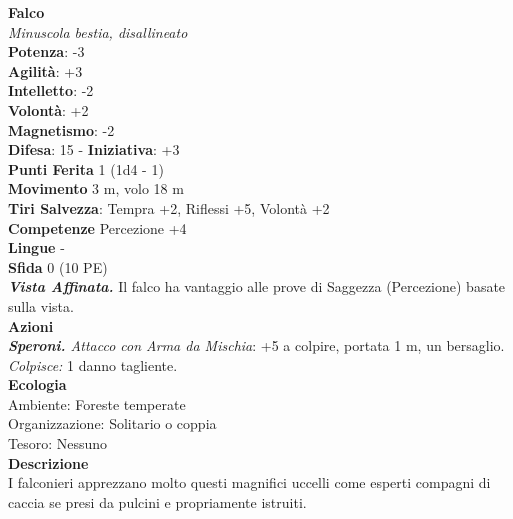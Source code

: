 \begin{multicols}{2}
\medskip\textbf{Falco}\\
\emph{Minuscola bestia, disallineato}\\
\textbf{Potenza}: -3\\
\textbf{Agilità}: +3\\
\textbf{Intelletto}: -2\\
\textbf{Volontà}: +2\\
\textbf{Magnetismo}: -2\\
\textbf{Difesa}: 15 - \textbf{Iniziativa}: +3\\
\textbf{Punti Ferita} 1 (1d4 - 1)\\
\textbf{Movimento} 3 m, volo 18 m\\
\textbf{Tiri Salvezza}: Tempra +2, Riflessi +5, Volontà +2 \\
\textbf{Competenze} Percezione +4\\
\textbf{Lingue} -\\
\textbf{Sfida} 0 (10 PE)\smallskip\\
\emph{\textbf{Vista Affinata.}} Il falco ha vantaggio alle prove di Saggezza (Percezione) basate sulla vista.\\
\smallskip\textbf{Azioni}\\
\emph{\textbf{Speroni.} Attacco con Arma da Mischia}: +5 a colpire, portata 1 m, un bersaglio.\\
\emph{Colpisce:} 1 danno tagliente. \\
\textbf{Ecologia}\\
Ambiente: Foreste temperate\\
Organizzazione: Solitario o coppia\\
Tesoro: Nessuno\\
\textbf{Descrizione}\\
I falconieri apprezzano molto questi magnifici uccelli come esperti compagni di caccia se presi da pulcini e propriamente istruiti. \\


\end{multicols}
